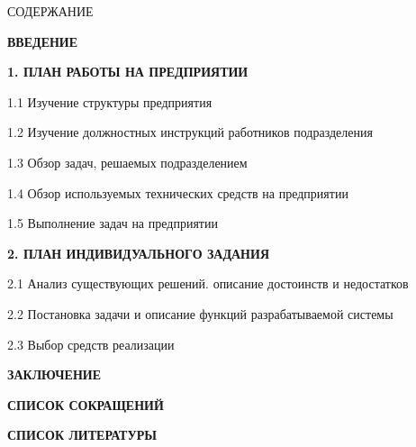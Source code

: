 {\gostTitleFont
    \redline
    СОДЕРЖАНИЕ
} 

\titlespace

{\gostFont
    \par
    \par {\bfseries ВВЕДЕНИЕ }
    \par {\bfseries 1. ПЛАН РАБОТЫ НА ПРЕДПРИЯТИИ }
    \par 1.1 Изучение структуры предприятия 
    \par 1.2 Изучение должностных инструкций работников подразделения 
    \par 1.3 Обзор задач, решаемых подразделением 
    \par 1.4 Обзор используемых технических средств на предприятии 
    \par 1.5 Выполнение задач на предприятии 
    \par {\bfseries 2. ПЛАН ИНДИВИДУАЛЬНОГО ЗАДАНИЯ }
    \par 2.1 Анализ существующих решений. описание достоинств и недостатков 
    \par 2.2 Постановка задачи и описание функций разрабатываемой системы  
    \par 2.3 Выбор средств реализации  
    \par {\bfseries ЗАКЛЮЧЕНИЕ } 
    \par {\bfseries СПИСОК СОКРАЩЕНИЙ } 
    \par {\bfseries СПИСОК ЛИТЕРАТУРЫ } 
    \par 
}